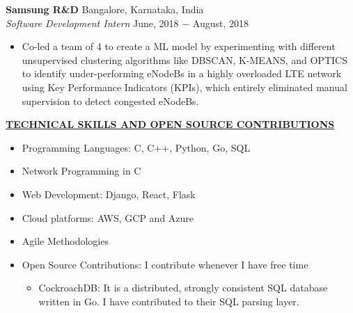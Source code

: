 \documentclass{article}
\begin{document}
\noindent \textbf{Samsung R\&D} \hfill Bangalore, Karnataka, India \\
\textit{Software Development Intern} \hfill June, 2018 $-$ August, 2018
\begin{itemize}[noitemsep,nolistsep,leftmargin=*]
\item {Co-led a team of 4 to create a ML model by experimenting with different unsupervised clustering algorithms like DBSCAN, K-MEANS, and OPTICS to identify under-performing eNodeBs in a highly overloaded LTE network using Key Performance Indicators (KPIs), which entirely eliminated manual supervision to detect congested eNodeBs. \\}
\end{itemize}

\noindent \textbf{\underline{TECHNICAL SKILLS AND OPEN SOURCE CONTRIBUTIONS}}
\begin{itemize}[noitemsep,nolistsep,leftmargin=*]
\item {Programming Languages: C, C++, Python, Go, SQL}
\item {Network Programming in C}
\item {Web Development: Django, React, Flask}
\item {Cloud platforms: AWS, GCP and Azure}
\item {Agile Methodologies}
\item {Open Source Contributions: I contribute whenever I have free time}
\begin{itemize}
    \item CockroachDB: It is a distributed, strongly consistent SQL database written in Go. I have contributed to their SQL parsing layer. \\
\end{itemize}
\end{itemize}

%
%
\end{document}
